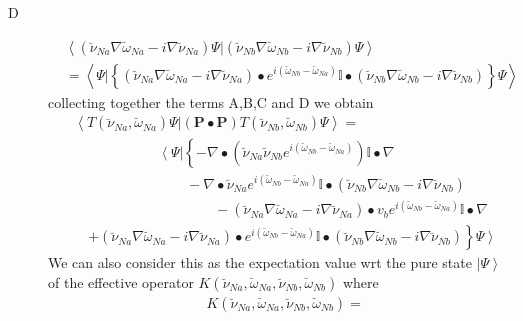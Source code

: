 \documentclass[aps,preprint]{revtex4}%
\begin{document}
\begin{description}
\item[D]
\begin{align}
&  \left\langle \left(  \breve{\nu}_{Na}\nabla\breve{\omega}_{Na}%
-i\nabla\breve{\nu}_{Na}\right)  \Psi|\left(  \breve{\nu}_{Nb}\nabla
\breve{\omega}_{Nb}-i\nabla\breve{\nu}_{Nb}\right)  \Psi\right\rangle
\nonumber\\
&  \left.  =\right.  \left\langle \Psi|\left\{  \left(  \breve{\nu}_{Na}%
\nabla\breve{\omega}_{Na}-i\nabla\breve{\nu}_{Na}\right)  \bullet e^{i\left(
\breve{\omega}_{Nb}-\breve{\omega}_{Na}\right)  }\mathbb{I}\bullet\left(
\breve{\nu}_{Nb}\nabla\breve{\omega}_{Nb}-i\nabla\breve{\nu}_{Nb}\right)
\right\}  \Psi\right\rangle
\end{align}
collecting together the terms A,B,C and D we obtain%
\begin{align}
&  \left\langle T\left(  \breve{\nu}_{Na},\breve{\omega}_{Na}\right)
\Psi|\left(  \mathbf{P\bullet P}\right)  T\left(  \breve{\nu}_{Nb}%
,\breve{\omega}_{Nb}\right)  \Psi\right\rangle =\nonumber\\
&  \qquad\qquad\qquad\left\langle \Psi\right.  |\left\{  -\nabla\bullet\left(
\breve{\nu}_{Na}\breve{\nu}_{Nb}e^{i\left(  \breve{\omega}_{Nb}-\breve{\omega
}_{Na}\right)  }\right)  \mathbb{I}\bullet\nabla\right. \nonumber\\
&  \qquad\qquad\qquad\qquad-\nabla\bullet\breve{\nu}_{Na}e^{i\left(
\breve{\omega}_{Nb}-\breve{\omega}_{Na}\right)  }\mathbb{I}\bullet\left(
\breve{\nu}_{Nb}\nabla\breve{\omega}_{Nb}-i\nabla\breve{\nu}_{Nb}\right)
\nonumber\\
&  \qquad\qquad\qquad\qquad\qquad-\left(  \breve{\nu}_{Na}\nabla\breve{\omega
}_{Na}-i\nabla\breve{\nu}_{Na}\right)  \bullet v_{b}e^{i\left(  \breve{\omega
}_{Nb}-\breve{\omega}_{Na}\right)  }\mathbb{I}\bullet\nabla\nonumber\\
&  \quad\left.  +\left(  \breve{\nu}_{Na}\nabla\breve{\omega}_{Na}%
-i\nabla\breve{\nu}_{Na}\right)  \bullet e^{i\left(  \breve{\omega}%
_{Nb}-\breve{\omega}_{Na}\right)  }\mathbb{I}\bullet\left(  \breve{\nu}%
_{Nb}\nabla\breve{\omega}_{Nb}-i\nabla\breve{\nu}_{Nb}\right)  \right\}
\left.  \Psi\right\rangle
\end{align}
We can also consider this as the expectation value wrt the pure state
$\left\vert \Psi\right\rangle $ of the effective operator $K\left(  \breve
{\nu}_{Na},\breve{\omega}_{Na},\breve{\nu}_{Nb},\breve{\omega}_{Nb}\right)  $
where
\begin{align}
&  K\left(  \breve{\nu}_{Na},\breve{\omega}_{Na},\breve{\nu}_{Nb}%
,\breve{\omega}_{Nb}\right)  =\nonumber\\

\end{align}
\end{description}
\end{document}

